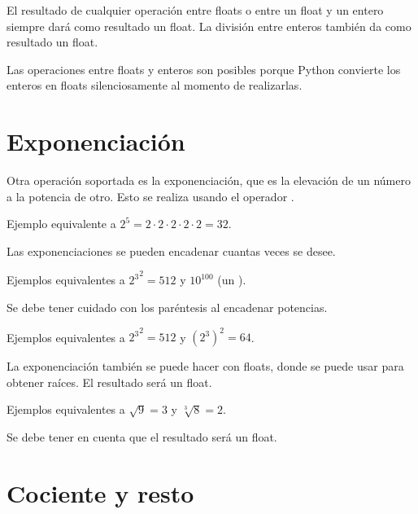 El resultado de cualquier operación entre floats o entre un float y un entero siempre dará como resultado un float.
La división entre enteros también da como resultado un float.


Las operaciones entre floats y enteros son posibles porque Python convierte los enteros en floats silenciosamente al momento de realizarlas.

\section{Exponenciación}

Otra operación soportada es la exponenciación, que es la elevación de un número a la potencia de otro.
Esto se realiza usando el operador \ttt{**}.


Ejemplo equivalente a $2 ^ 5 = 2\cdot 2\cdot 2\cdot 2\cdot 2 = 32$.


Las exponenciaciones se pueden encadenar cuantas veces se desee.

Ejemplos equivalentes a ${2 ^ 3} ^ 2 = 512$ y $10 ^ {100}$ (un ).


Se debe tener cuidado con los paréntesis al encadenar potencias.

Ejemplos equivalentes a ${2 ^ 3} ^ 2 = 512$ y $(2 ^ 3) ^ 2 = 64$.


La exponenciación también se puede hacer con floats, donde se puede usar para obtener raíces.
El resultado será un float.


Ejemplos equivalentes a $\sqrt{9} = 3$ y $\sqrt[3]{8} = 2$.


Se debe tener en cuenta que el resultado será un float.

\section{Cociente y resto}

